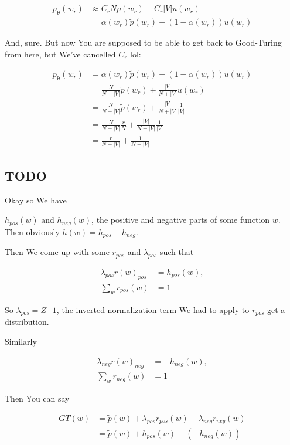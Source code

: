 \documentclass{article}
\newcommand{\vtheta}{\boldsymbol{\theta}}
\newcommand{\model}{p_{\vtheta}}
\begin{document}
	    \begin{align}
	    	\model(w_r) &\approx C_r N\tilde{p}(w_r) + C_r |V|u(w_r)\\
	    	&= \alpha(w_r)\tilde{p}(w_r) + (1-\alpha(w_r))u(w_r )
	    \end{align}
	    
	    And, sure. But now You are supposed to be able to get back to Good-Turing from here, but We've cancelled $C_r$ lol:
	    
	    \begin{align}
	    	\model(w_r) &= \alpha(w_r)\tilde{p}(w_r) + (1-\alpha(w_r))u(w_r )\\
	    	&= \frac{N}{N + |V|}\tilde{p}(w_r) + \frac{|V|}{N + |V|}u(w_r )\\
	    	&= \frac{N}{N + |V|}\tilde{p}(w_r) + \frac{|V|}{N + |V|}\frac{1}{|V|}\\
	    	&= \frac{N}{N + |V|}\frac{r}{N} + \frac{|V|}{N + |V|}\frac{1}{|V|}\\
	    	&= \frac{r}{N + |V|} + \frac{1}{N + |V|}
	    \end{align}
	    
	    
	\subsection{TODO}
	
		Okay so We have 
		
		$h_{pos}(w)$ and $h_{neg}(w)$, the positive and negative parts of some function $w$. Then obviously $h(w) = h_{pos} + h_{neg}$.
		
		Then We come up with some $r_{pos}$ and $\lambda_{pos}$ such that 
		
		\begin{align}
			\lambda_{pos}r(w)_{pos} &= h_{pos}(w),\\
			\sum_w r_{pos}(w) &= 1
		\end{align}
		
		So $\lambda_{pos} = Z{-1}$, the inverted normalization term We had to apply to $r_{pos}$ get a distribution.
		
		Similarly
		
		\begin{align}
			\lambda_{neg} r(w)_{neg} &= -h_{neg}(w),\\
			\sum_w r_{neg}(w) &= 1
		\end{align}
		
		Then You can say
		
		\begin{align}
			GT(w) &= \tilde{p}(w) + \lambda_{pos}r_{pos}(w) - \lambda_{neg}r_{neg}(w)\\
			&= \tilde{p}(w) + h_{pos}(w) - (-h_{neg}(w))
		\end{align}
		
\end{document}
